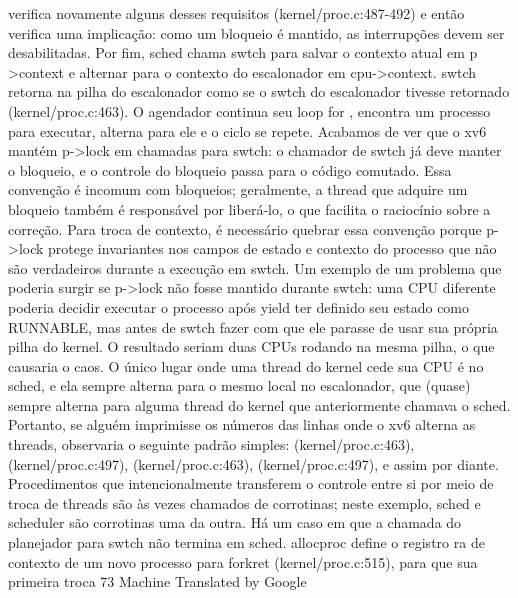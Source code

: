 verifica  novamente  alguns  desses  requisitos  (kernel/proc.c:487-492)  e  então  verifica  uma  implicação:  como  um  bloqueio  
é  mantido,  as  interrupções  devem  ser  desabilitadas.  Por  fim,  sched  chama  swtch  para  salvar  o  contexto  atual  em  p
>context  e  alternar  para  o  contexto  do  escalonador  em  cpu->context.  swtch  retorna  na  pilha  do  escalonador  como  se  o  
swtch  do  escalonador  tivesse  retornado  (kernel/proc.c:463).  O  agendador  continua  seu  loop  for ,  encontra  um  processo  
para  executar,  alterna  para  ele  e  o  ciclo  se  repete.
 Acabamos  de  ver  que  o  xv6  mantém  p->lock  em  chamadas  para  swtch:  o  chamador  de  swtch  já  deve  manter  o  
bloqueio,  e  o  controle  do  bloqueio  passa  para  o  código  comutado.  Essa  convenção  é  incomum  com  bloqueios;  
geralmente,  a  thread  que  adquire  um  bloqueio  também  é  responsável  por  liberá-lo,  o  que  facilita  o  raciocínio  sobre  a  
correção.  Para  troca  de  contexto,  é  necessário  quebrar  essa  convenção  porque  p->lock  protege  invariantes  nos  campos  
de  estado  e  contexto  do  processo  que  não  são  verdadeiros  durante  a  execução  em  swtch.  Um  exemplo  de  um  problema  
que  poderia  surgir  se  p->lock  não  fosse  mantido  durante  swtch:  uma  CPU  diferente  poderia  decidir  executar  o  processo  
após  yield  ter  definido  seu  estado  como  RUNNABLE,  mas  antes  de  swtch  fazer  com  que  ele  parasse  de  usar  sua  
própria  pilha  do  kernel.  O  resultado  seriam  duas  CPUs  rodando  na  mesma  pilha,  o  que  causaria  o  caos.
 O  único  lugar  onde  uma  thread  do  kernel  cede  sua  CPU  é  no  sched,  e  ela  sempre  alterna  para  o  mesmo  local  no  
escalonador,  que  (quase)  sempre  alterna  para  alguma  thread  do  kernel  que  anteriormente  chamava  o  sched.  Portanto,  
se  alguém  imprimisse  os  números  das  linhas  onde  o  xv6  alterna  as  threads,  observaria  o  seguinte  padrão  simples:  
(kernel/proc.c:463),  (kernel/proc.c:497),  (kernel/proc.c:463),  (kernel/proc.c:497),  e  assim  por  diante.  Procedimentos  que  
intencionalmente  transferem  o  controle  entre  si  por  meio  de  troca  de  threads  são  às  vezes  chamados  de  corrotinas;  
neste  exemplo,  sched  e  scheduler  são  corrotinas  uma  da  outra.
 Há  um  caso  em  que  a  chamada  do  planejador  para  swtch  não  termina  em  sched.  allocproc  define  o  registro  ra  de  
contexto  de  um  novo  processo  para  forkret  (kernel/proc.c:515),  para  que  sua  primeira  troca
 73
Machine Translated by Google

